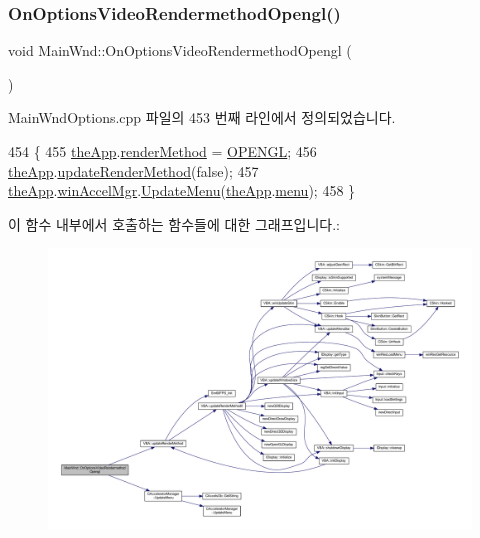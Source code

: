 \subsubsection{\texorpdfstring{On\+Options\+Video\+Rendermethod\+Opengl()}{OnOptionsVideoRendermethodOpengl()}}
{\footnotesize\ttfamily void Main\+Wnd\+::\+On\+Options\+Video\+Rendermethod\+Opengl (\begin{DoxyParamCaption}{ }\end{DoxyParamCaption})\hspace{0.3cm}{\ttfamily [protected]}}



Main\+Wnd\+Options.\+cpp 파일의 453 번째 라인에서 정의되었습니다.


\begin{DoxyCode}
454 \{
455   \mbox{\hyperlink{_v_b_a_8cpp_a8095a9d06b37a7efe3723f3218ad8fb3}{theApp}}.\mbox{\hyperlink{class_v_b_a_ae31026d8986a7658f3aaa46fba9de663}{renderMethod}} = \mbox{\hyperlink{_display_8h_aa50f63b0688d0250e0be64d8401d09a0a4cd6ad65d345a77065fda71b3751ec24}{OPENGL}};
456   \mbox{\hyperlink{_v_b_a_8cpp_a8095a9d06b37a7efe3723f3218ad8fb3}{theApp}}.\mbox{\hyperlink{class_v_b_a_a1d5b9c4597d5c565ce4d8ba1e594a89f}{updateRenderMethod}}(\textcolor{keyword}{false});
457   \mbox{\hyperlink{_v_b_a_8cpp_a8095a9d06b37a7efe3723f3218ad8fb3}{theApp}}.\mbox{\hyperlink{class_v_b_a_ad7ebce057dbde0ca88cee75e84721a89}{winAccelMgr}}.\mbox{\hyperlink{class_c_accelerator_manager_ac7411d20f413ea0ec3bd65705b564adf}{UpdateMenu}}(\mbox{\hyperlink{_v_b_a_8cpp_a8095a9d06b37a7efe3723f3218ad8fb3}{theApp}}.\mbox{\hyperlink{class_v_b_a_acf9d855b5b959a2df9c6cb21b888366e}{menu}});
458 \}
\end{DoxyCode}
이 함수 내부에서 호출하는 함수들에 대한 그래프입니다.\+:
\nopagebreak
\begin{figure}[H]
\begin{center}
\leavevmode
\includegraphics[width=350pt]{class_main_wnd_ad8709590f7d9289c19ec3a216490d742_cgraph}
\end{center}
\end{figure}
\mbox{\label{class_main_wnd_abc93855509cbfc4d8c063d7be9d765d4}} 
